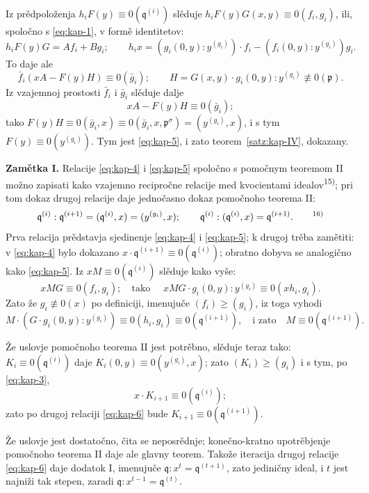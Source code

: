 \documentclass[11pt]{article}
\theoremstyle{plain}
\begin{document}
Iz prědpoloženja $h_{i}F(y) \equiv 0(\mathfrak{q}^{(i)})$
slěduje
$h_{i}F(y)G(x,y) \equiv 0(f_{i}, g_{i})$, ili, spoločno
s \eqref{eq:kap-1}, v formě identitetov:
\[
h_{i}F(y)G = Af_{i} + Bg_{i}; \qquad
h_{i}x = (g_{i}(0,y):y^{(g_{i})})\cdot f_{i}
- (f_{i}(0,y):y^{(g_{i})})g_{i}.
\]
To daje ale
\[
\bar{f}_{i}(xA - F(y)H) \equiv 0(\bar{g}_{i}); \qquad
H = G(x,y) \cdot g_{i}(0,y) : y^{(g_{i})} \not\equiv 0(\mathfrak{p}).
\]
Iz vzajemnoj prostosti $\bar{f}_{i}$ i $\bar{g}_{i}$ slěduje dalje
\[
xA - F(y)H \equiv 0(\bar{g}_{i});
\]
tako $F(y)H \equiv 0(\bar{g}_{i}, x)
\equiv 0(\bar{g}_{i}, x, \mathfrak{p}^{\sigma})
= (y^{(g_{i})}, x)$, i s tym $F(y) \equiv 0(y^{(g_{i})})$.
Tym jest \eqref{eq:kap-5}, i zato teorem~\ref{satz:kap-IV}, dokazany.

\smallskip
\textbf{Zamětka I.} Relacije \eqref{eq:kap-4} i \eqref{eq:kap-5}
spoločno s pomočnym teoremom II možno zapisati kako vzajemno
recipročne relacije med kvocientami idealov\textsuperscript{15)};
pri tom dokaz drugoj relacije daje jednočasno dokaz pomočnoho
teorema II:
\begin{equation}\label{eq:kap-6}
\mathfrak{q}^{(i)} : \mathfrak{q}^{(i+1)}
= (\mathfrak{q}^{(i)}, x) = (y^{(g_{i})}, x); \qquad
\mathfrak{q}^{(i)} : (\mathfrak{q}^{(i)}, x)
= \mathfrak{q}^{(i+1)}.\qquad\text{\textsuperscript{16)}}
\end{equation}
Prva relacija prědstavja sjedinenje \eqref{eq:kap-4} i
\eqref{eq:kap-5}; k drugoj trěba zamětiti: v \eqref{eq:kap-4}
bylo dokazano
$x \cdot \mathfrak{q}^{(i+1)} \equiv 0(\mathfrak{q}^{(i)})$;
obratno dobyva se analogično kako \eqref{eq:kap-5}. Iz
$xM \equiv 0(\mathfrak{q}^{(i)})$ slěduje kako vyše:
\[
xMG \equiv 0(f_{i}, g_{i}); \quad \text{tako }\quad
xMG \cdot g_{i}(0,y) : y^{(g_{i})}
\equiv 0(xh_{i}, g_{i}).
\]
Zato že $g_{i} \not\equiv 0(x)$ po definiciji, imenujuče
$(f_{i}) \geq (g_{i})$, iz toga vyhodi
\[
M \cdot (G \cdot g_{i}(0,y) : y^{(g_{i})})
\equiv 0(h_{i}, g_{i}) \equiv 0(\mathfrak{q}^{(i+1)}),
\quad\text{i zato}\quad M \equiv 0(\mathfrak{q}^{(i+1)}).
\]

Že uslovje pomočnoho teorema II jest potrěbno, slěduje teraz tako:
$K_{i} \equiv 0(\mathfrak{q}^{(i)})$ daje
$K_{i}(0,y) \equiv 0(y^{(g_{i})}, x)$; zato
$(K_{i}) \geq (g_{i})$ i s tym, po \eqref{eq:kap-3},
\[
x \cdot K_{i+1} \equiv 0(\mathfrak{q}^{(i)});
\]
zato po drugoj relaciji \eqref{eq:kap-6} bude
$K_{i+1} \equiv 0(\mathfrak{q}^{(i+1)})$.

Že uslovje jest dostatočno, čita se neposrědnje; konečno-kratno
upotrěbjenje pomočnoho teorema II daje ale glavny teorem. Takože
iteracija drugoj relacije \eqref{eq:kap-6} daje dodatok I, imenujuče
$\mathfrak{q} : x^{t} = \mathfrak{q}^{(t+1)}$, zato jediničny
ideal, i $t$ jest najniži tak stepen, zaradi
$\mathfrak{q} : x^{t-1} = \mathfrak{q}^{(t)}$.
\end{document}
